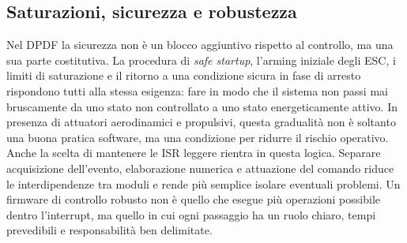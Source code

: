 \documentclass[11pt]{report}
\begin{document}
	\subsection{Saturazioni, sicurezza e robustezza}
	Nel DPDF la sicurezza non è un blocco aggiuntivo rispetto al controllo, ma una sua parte costitutiva. La procedura di \textit{safe startup}, l'arming iniziale degli ESC, i limiti di saturazione e il ritorno a una condizione sicura in fase di arresto rispondono tutti alla stessa esigenza: fare in modo che il sistema non passi mai bruscamente da uno stato non controllato a uno stato energeticamente attivo. In presenza di attuatori aerodinamici e propulsivi, questa gradualità non è soltanto una buona pratica software, ma una condizione per ridurre il rischio operativo.\\
	Anche la scelta di mantenere le ISR leggere rientra in questa logica. Separare acquisizione dell'evento, elaborazione numerica e attuazione del comando riduce le interdipendenze tra moduli e rende più semplice isolare eventuali problemi. Un firmware di controllo robusto non è quello che esegue più operazioni possibile dentro l'interrupt, ma quello in cui ogni passaggio ha un ruolo chiaro, tempi prevedibili e responsabilità ben delimitate.
\end{document}
